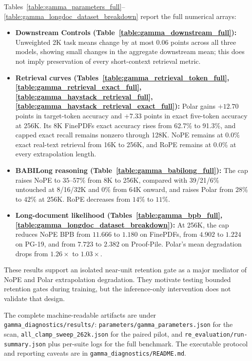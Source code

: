 Tables~\ref{table:gamma_parameters_full}--\ref{table:gamma_longdoc_dataset_breakdown} report the full numerical arrays:
\begin{itemize}
  \item \textbf{Downstream Controls (Table~\ref{table:gamma_downstream_full}):} Unweighted 2K task means change by at most $0.06$ points across all three models, showing small changes in the aggregate downstream mean; this does not imply preservation of every short-context retrieval metric.
  \item \textbf{Retrieval curves (Tables~\ref{table:gamma_retrieval_token_full}, \ref{table:gamma_retrieval_exact_full}, \ref{table:gamma_haystack_retrieval_full}, \ref{table:gamma_haystack_retrieval_exact_full}):} Polar gains $+12.70$ points in target-token accuracy and $+7.33$ points in exact five-token accuracy at 256K. Its 8K FinePDFs exact accuracy rises from 62.7\% to 91.3\%, and capped exact recall remains nonzero through 128K. NoPE remains at 0.0\% exact real-text retrieval from 16K to 256K, and RoPE remains at 0.0\% at every extrapolation length.
  \item \textbf{BABILong reasoning (Table~\ref{table:gamma_babilong_full}):} The cap raises NoPE to $35$--$57\%$ from 8K to 256K, compared with 39/21/6\% untouched at 8/16/32K and 0\% from 64K onward, and raises Polar from $28\%$ to $42\%$ at 256K. RoPE decreases from $14\%$ to $11\%$.
  \item \textbf{Long-document likelihood (Tables~\ref{table:gamma_bpb_full}, \ref{table:gamma_longdoc_dataset_breakdown}):} At 256K, the cap reduces NoPE BPB from $11.666$ to $1.180$ on FinePDFs, from $4.902$ to $1.224$ on PG-19, and from $7.723$ to $2.382$ on Proof-Pile. Polar's mean degradation drops from $1.26\times$ to $1.03\times$.
\end{itemize}



These results support an isolated near-unit retention gate as a major mediator of NoPE and Polar extrapolation degradation. They motivate testing bounded retention gates during training, but the inference-only intervention does not validate that design.

The complete machine-readable artifacts are under \texttt{gamma\_diagnostics/results/}: \texttt{parameters/gamma\_parameters.json} for the scan, \texttt{all\_clamp\_sweep\_262k.json} for the paired pilot, and \texttt{re\_evaluation/run-summary.json} plus per-suite logs for the full benchmark. The executable protocol and reporting caveats are in \texttt{gamma\_diagnostics/README.md}.


